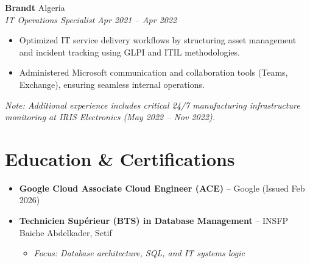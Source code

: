 \documentclass[11pt,a4paper]{article}
\newcommand{\resumeItem}[4]{
  \vspace{1.5mm}
  \noindent\textbf{#1} \hfill #2 \\
  \textit{#3} \hfill \textit{#4} \par\vspace{1mm}
}
\begin{document}
\resumeItem{Brandt}{Algeria}
{IT Operations Specialist}{Apr 2021 -- Apr 2022}
\begin{itemize}[leftmargin=0.15in, itemsep=1pt]
    \item Optimized IT service delivery workflows by structuring asset management and incident tracking using GLPI and ITIL methodologies.
    \item Administered Microsoft communication and collaboration tools (Teams, Exchange), ensuring seamless internal operations.
\end{itemize}

\vspace{2mm}
\noindent \textit{\small *Note: Additional experience includes critical 24/7 manufacturing infrastructure monitoring at IRIS Electronics (May 2022 -- Nov 2022).}

\section*{Education \& Certifications}
\begin{itemize}[leftmargin=0.15in, itemsep=4pt]
    \item \textbf{Google Cloud Associate Cloud Engineer (ACE)} -- Google (Issued Feb 2026)
    \item \textbf{Technicien Supérieur (BTS) in Database Management} -- INSFP Baiche Abdelkader, Setif 
    \begin{itemize}[leftmargin=0.2in, label={--}, itemsep=0pt]
        \item \textit{Focus: Database architecture, SQL, and IT systems logic}
    \end{itemize}
\end{itemize}
\end{document}
